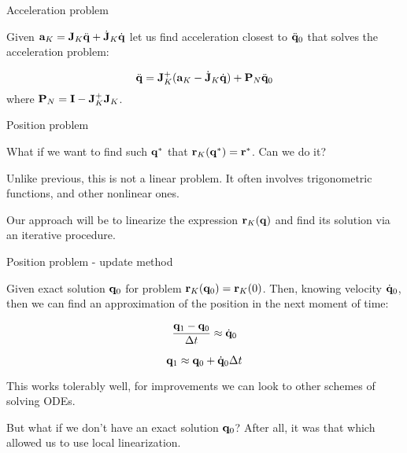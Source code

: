 \documentclass{beamer}
\begin{document}
\begin{frame}{Acceleration problem}
	\begin{flushleft}
		
		Given $\mathbf{a}_K = \mathbf{J}_K \ddot{\mathbf{q}} + \dot{\mathbf{J}}_K \dot{\mathbf{q}}$ let us find acceleration closest to $\ddot{\mathbf{q}}_0$ that solves the acceleration problem:
		
		\begin{equation}
			\ddot{\mathbf{q}}  = \mathbf{J}_K^+ (\mathbf{a}_K - \dot{\mathbf{J}}_K \dot{\mathbf{q}})
			+
			\mathbf{P}_N \ddot{\mathbf{q}}_0
		\end{equation}		
	where $\mathbf{P}_N = \mathbf{I} -  \mathbf{J}_K^+ \mathbf{J}_K$.
	
		
	\end{flushleft}
\end{frame}



\begin{frame}{Position problem}
	\begin{flushleft}
		
		What if we want to find such $\mathbf{q}^*$ that $\mathbf{r}_K(\mathbf{q}^*) = \mathbf{r}^*$. Can we do it?
		
		\bigskip
		
		Unlike previous, this is not a linear problem. It often involves trigonometric functions, and other nonlinear ones.
		
		\bigskip
		
		Our approach will be to linearize the expression $\mathbf{r}_K(\mathbf{q})$ and find its solution via an iterative procedure.
		
	\end{flushleft}
\end{frame}



\begin{frame}{Position problem - update method}
	\begin{flushleft}
		
		Given exact solution $\mathbf{q}_0$ for problem $\mathbf{r}_K(\mathbf{q}_0) = \mathbf{r}_K(0)$. Then, knowing velocity $\dot{\mathbf{q}}_0$, then we can find an approximation of the position in the next moment of time:
		
		\begin{equation}
			\frac{\mathbf{q}_1 - \mathbf{q}_0}{\Delta t} \approx \dot{\mathbf{q}}_0
		\end{equation}
	
		\begin{equation}
		\mathbf{q}_1 \approx \mathbf{q}_0 + \dot{\mathbf{q}}_0 \Delta t
		\end{equation}
	
		This works tolerably well, for improvements we can look to other schemes of solving ODEs.
		
		\bigskip
	
		But what if we don't have an exact solution $\mathbf{q}_0$? After all, it was that which allowed us to use local linearization.
		
	\end{flushleft}
\end{frame}
\end{document}
